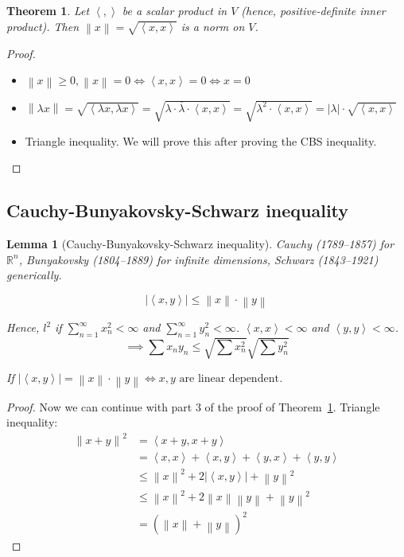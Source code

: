 \documentclass{article}
\newcounter{lecref}[section]
\numberwithin{lecref}{section}
\newtheorem{theorem}[lecref]{Theorem}
\newtheorem{lemma}[lecref]{Lemma}
\newcommand{\angel}[1]{\left\langle#1\right\rangle}
\newcommand{\norm}[1]{\left\|#1\right\|}
\newcommand{\card}[1]{\left|#1\right|}
\begin{document}
\begin{theorem} %
  \label{thm:t819}
  Let $\angel{,}$ be a scalar product in $V$ (hence, positive-definite inner product).
  Then $\norm{x} = \sqrt{\angel{x,x}}$ is a norm on $V$.
\end{theorem}

\begin{proof}
  \begin{itemize}
    \item $\norm{x} \geq 0, \norm{x} = 0 \iff \angel{x,x} = 0 \iff x = 0$
    \item $\norm{\lambda x} = \sqrt{\angel{\lambda x, \lambda x}} = \sqrt{\lambda \cdot \overline{\lambda} \cdot \angel{x,x}} = \sqrt{\lambda^2 \cdot \angel{x,x}} = \card{\lambda} \cdot \sqrt{\angel{x,x}}$
    \item Triangle inequality. We will prove this after proving the CBS inequality.
  \end{itemize}
\end{proof}

\subsection{Cauchy-Bunyakovsky-Schwarz inequality}

\begin{lemma}[Cauchy-Bunyakovsky-Schwarz inequality] %
  \label{thm:cbs}
  Cauchy (1789--1857) for $\mathbb R^n$,
  Bunyakovsky (1804--1889) for infinite dimensions,
  Schwarz (1843--1921) generically.

  \[ \card{\angel{x,y}} \leq \norm{x} \cdot \norm{y} \]

  Hence, $l^2$ if $\sum_{n=1}^\infty x_n^2 < \infty$ and $\sum_{n=1}^\infty y_n^2 < \infty$.
  $\angel{x,x} < \infty$ and $\angel{y,y} < \infty$.
  \[ \implies \sum x_n y_n \leq \sqrt{\sum x_n^2} \sqrt{\sum y_n^2} \]

  If $\card{\angel{x,y}} = \norm{x} \cdot \norm{y} \iff x,y \text{ are linear dependent}$.
\end{lemma}

\begin{proof}
  Now we can continue with part 3 of the proof of Theorem~\ref{thm:t819}.
  Triangle inequality:
  \begin{align*}
    \norm{x + y}^2 &= \angel{x + y, x + y} \\
      &= \angel{x,x} + \angel{x,y} + \angel{y,x} + \angel{y,y} \\
      &\leq \norm{x}^2 + 2 \card{\angel{x, y}} + \norm{y}^2 \\
      &\leq \norm{x}^2 + 2 \norm{x} \norm{y} + \norm{y}^2 \\
      &= \left(\norm x + \norm y\right)^2
  \end{align*}
\end{proof}
\end{document}
